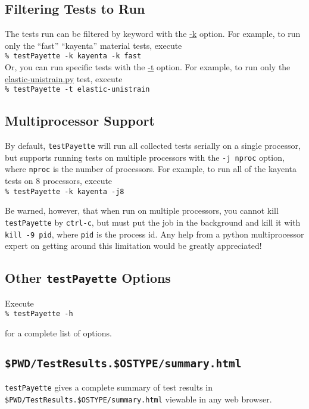 \documentclass[11pt]{article}
\newcommand{\testPayette}{{\texttt{testPayette}}}
\newcommand{\termcommand}[1]{\indent\hspace{.2in}\texttt{\% #1}\newline}
\newcommand{\summhtml}{\texttt{\$PWD/TestResults.\$OSTYPE/summary.html}}
\begin{document}
\subsection{Filtering Tests to Run}
The tests run can be filtered by keyword with the \url{-k} option. For example,
to run only the ``fast'' ``kayenta'' material tests, execute \\

\termcommand{testPayette -k kayenta -k fast} \\

\noindent Or, you can run specific tests with the \url{-t} option.  For example,
to run only the \url{elastic-unistrain.py} test, execute\\

\termcommand{testPayette -t elastic-unistrain} \\

\subsection{Multiprocessor Support}
By default, \testPayette{} will run all collected tests serially on a single
processor, but supports running tests on multiple processors with the \texttt{-j
  nproc} option, where \texttt{nproc} is the number of processors.  For example,
to run all of the kayenta tests on 8 processors, execute \\

\termcommand{testPayette -k kayenta -j8}

\noindent Be warned, however, that when run on multiple processors, you cannot
kill \testPayette{} by \texttt{ctrl-c}, but must put the job in the background
and kill it with \texttt{kill -9 pid}, where \texttt{pid} is the process id. Any
help from a python multiprocessor expert on getting around this limitation would
be greatly appreciated!

\subsection{Other \testPayette{} Options}
Execute \\

\termcommand{testPayette -h}

\noindent for a complete list of options.

\subsection{\summhtml{}}
\testPayette{} gives a complete summary of test results in \summhtml{} viewable
in any web browser.
\end{document}
